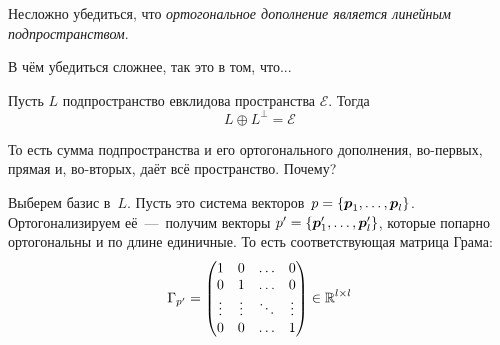 \documentclass[a4paper,12pt]{article}
\begin{document}
  Несложно убедиться, что \emph{ортогональное дополнение является линейным подпространством}.
  
  В чём убедиться сложнее, так это в том, что...
  
  \begin{proposition}
    Пусть $L$ подпространство евклидова пространства $\mathcal E$.
    Тогда
    \[
      L \oplus L^{\perp} = \mathcal E
    \]
  \end{proposition}
  
  То есть сумма подпространства и его ортогонального дополнения, во-первых, прямая и, во-вторых, даёт всё пространство.
  Почему?
  
  Выберем базис в~$L$.
  Пусть это система векторов~$p \hm= \{\bds p_1, \ldots, \bds p_l\}$.
  Ортогонализируем её~---~получим векторы $p' \hm= \{\bds p_1', \ldots, \bds p_l'\}$, которые попарно ортогональны и по длине единичные.
  То есть соответствующая матрица Грама:
  \[
    \Gamma_{p'} = \begin{pmatrix}
      1      & 0      & \ldots & 0\\
      0      & 1      & \ldots & 0\\
      \vdots & \vdots & \ddots & \vdots\\
      0      & 0      & \ldots & 1
    \end{pmatrix} \in \operatorname{\mathbb R}^{l \times l}
  \]
  
\end{document}
